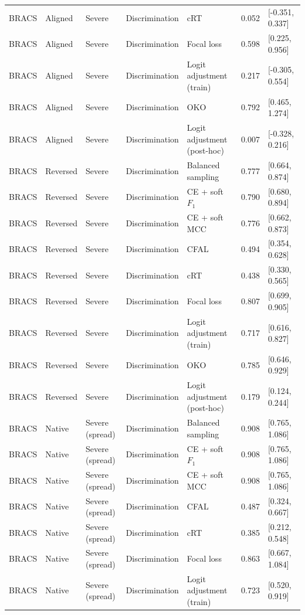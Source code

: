 \begin{longtable}{lllllll}
BRACS & Aligned & Severe & Discrimination & cRT & 0.052 & [-0.351, 0.337] \\
BRACS & Aligned & Severe & Discrimination & Focal loss & 0.598 & [0.225, 0.956] \\
BRACS & Aligned & Severe & Discrimination & Logit adjustment (train) & 0.217 & [-0.305, 0.554] \\
BRACS & Aligned & Severe & Discrimination & OKO & 0.792 & [0.465, 1.274] \\
BRACS & Aligned & Severe & Discrimination & Logit adjustment (post-hoc) & 0.007 & [-0.328, 0.216] \\
BRACS & Reversed & Severe & Discrimination & Balanced sampling & 0.777 & [0.664, 0.874] \\
BRACS & Reversed & Severe & Discrimination & CE + soft $F_1$ & 0.790 & [0.680, 0.894] \\
BRACS & Reversed & Severe & Discrimination & CE + soft MCC & 0.776 & [0.662, 0.873] \\
BRACS & Reversed & Severe & Discrimination & CFAL & 0.494 & [0.354, 0.628] \\
BRACS & Reversed & Severe & Discrimination & cRT & 0.438 & [0.330, 0.565] \\
BRACS & Reversed & Severe & Discrimination & Focal loss & 0.807 & [0.699, 0.905] \\
BRACS & Reversed & Severe & Discrimination & Logit adjustment (train) & 0.717 & [0.616, 0.827] \\
BRACS & Reversed & Severe & Discrimination & OKO & 0.785 & [0.646, 0.929] \\
BRACS & Reversed & Severe & Discrimination & Logit adjustment (post-hoc) & 0.179 & [0.124, 0.244] \\
BRACS & Native & Severe (spread) & Discrimination & Balanced sampling & 0.908 & [0.765, 1.086] \\
BRACS & Native & Severe (spread) & Discrimination & CE + soft $F_1$ & 0.908 & [0.765, 1.086] \\
BRACS & Native & Severe (spread) & Discrimination & CE + soft MCC & 0.908 & [0.765, 1.086] \\
BRACS & Native & Severe (spread) & Discrimination & CFAL & 0.487 & [0.324, 0.667] \\
BRACS & Native & Severe (spread) & Discrimination & cRT & 0.385 & [0.212, 0.548] \\
BRACS & Native & Severe (spread) & Discrimination & Focal loss & 0.863 & [0.667, 1.084] \\
BRACS & Native & Severe (spread) & Discrimination & Logit adjustment (train) & 0.723 & [0.520, 0.919] \\

\end{longtable}
